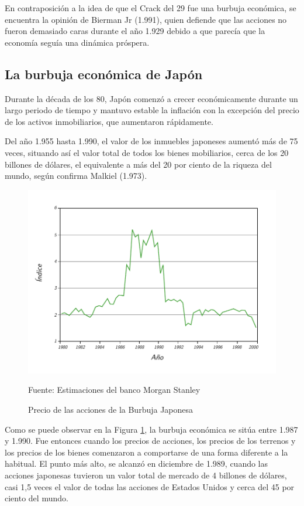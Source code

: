 En contraposición a la idea de que el Crack del 29 fue una burbuja económica, se encuentra la opinión de Bierman Jr (1.991), quien defiende que las acciones no fueron demasiado caras durante el año 1.929 debido a que parecía que la economía seguía una dinámica próspera.

\subsection{La burbuja económica de Japón}  

Durante la década de los 80, Japón comenzó a crecer económicamente durante un largo periodo de tiempo y mantuvo estable la inflación con la excepción del precio de los activos inmobiliarios, que aumentaron rápidamente.

Del año 1.955 hasta 1.990, el valor de los inmuebles japoneses aumentó más de 75 veces, situando así el valor total de todos los bienes mobiliarios, cerca de los 20 billones de dólares, el equivalente a más del 20 por ciento de la riqueza del mundo, según confirma Malkiel (1.973).

\begin{figure}[!h] 
\caption{Precio de las acciones de la Burbuja Japonesa} 
\centering \includegraphics[width=150mm]{capitulos/graficos/JapaneseStockMarketBubble} 
\label{fig:Precio de las acciones de la Burbuja Japonesa} 

	\footnotesize
	Fuente: Estimaciones del banco Morgan Stanley

\end{figure}

Como se puede observar en la Figura \ref{fig:Precio de las acciones de la Burbuja Japonesa}, la burbuja económica se sitúa entre 1.987 y 1.990. Fue entonces cuando los precios de acciones, los precios de los terrenos y los precios de los bienes comenzaron a comportarse de una forma diferente a la habitual. El punto más alto, se alcanzó en diciembre de 1.989, cuando las acciones japonesas tuvieron un valor total de mercado de 4 billones de dólares, casi 1,5 veces el valor de todas las acciones de Estados Unidos y cerca del 45 por ciento del mundo.

